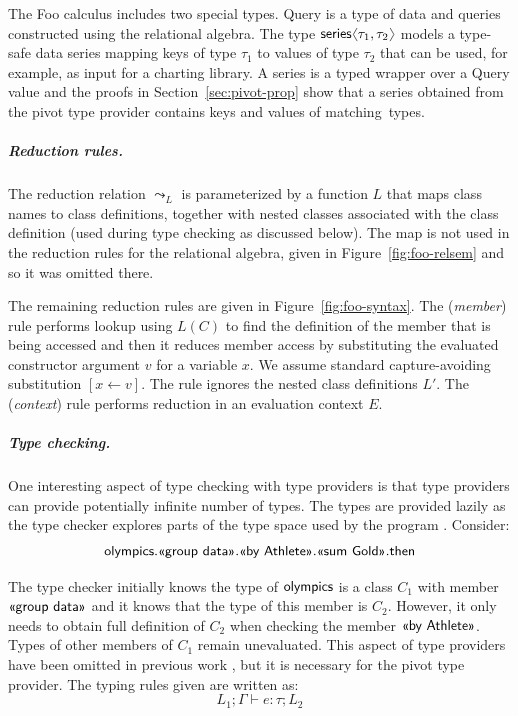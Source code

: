 \documentclass[a4paper,UKenglish]{lipics-v2016}
\theoremstyle{plain}
\theoremstyle{definition}
\newcommand{\langl}{\begin{picture}(4.5,7)
\put(1.1,2.5){\rotatebox{60}{\line(1,0){5.5}}}
\put(1.1,2.5){\rotatebox{300}{\line(1,0){5.5}}}
\end{picture}}
\newcommand{\rangl}{\begin{picture}(4.5,7)
\put(.9,2.5){\rotatebox{120}{\line(1,0){5.5}}}
\put(.9,2.5){\rotatebox{240}{\line(1,0){5.5}}}
\end{picture}}
\newcommand{\ident}[1]{\textnormal{\sffamily #1}}
\newcommand{\qident}[1]{\textnormal{\sffamily \guillemotleft #1\guillemotright}}
\begin{document}
The Foo calculus includes two special types. \ident{Query} is a type of data and queries 
constructed using the relational algebra. The type $\ident{series}\langl \tau_1, \tau_2 \rangl$ 
models a type-safe data series mapping keys of type $\tau_1$ to values of type $\tau_2$ that
can be used, for example, as input for a charting library. A series is a typed wrapper over a 
\ident{Query} value and the proofs in Section~\ref{sec:pivot-prop} show that a series obtained 
from the pivot type provider contains keys and values of matching~types.

\subparagraph{Reduction rules.} The reduction relation $\leadsto_L$ is parameterized by a function
$L$ that maps class names to class definitions, together with nested classes associated with the
class definition (used during type checking as discussed below). The map is not used in the 
reduction rules for the relational algebra, given in Figure~\ref{fig:foo-relsem} and so it was 
omitted there.

The remaining reduction rules are given in Figure~\ref{fig:foo-syntax}. The (\emph{member}) rule 
performs lookup using $L(C)$ to find the definition of the member that is being accessed and then
it reduces member access by substituting the evaluated constructor argument $v$ for a variable $x$.
We assume standard capture-avoiding substitution $[x\leftarrow v]$. The rule ignores the nested 
class definitions $L'$. The (\emph{context}) rule performs reduction in an evaluation context $E$.

\subparagraph{Type checking.} One interesting aspect of type checking with type providers is that
type providers can provide potentially infinite number of types. The types are provided 
lazily as the type checker explores parts of the type space used by the program \cite{inforich}. 
Consider:
%
\begin{equation*}
\ident{olympics}.\qident{group data}.\qident{by Athlete}.\qident{sum Gold}.\ident{then}
\end{equation*}

\noindent
The type checker initially knows the type of $\ident{olympics}$ is a class $C_1$ with member 
$\qident{group data}$ and it knows that the type of this member is $C_2$. However, it only needs to 
obtain full definition of $C_2$ when checking the member $\qident{by Athlete}$. Types of other 
members of $C_1$ remain unevaluated. This aspect of type
providers have been omitted in previous work \cite{fsdata,liteq}, but it is necessary for the pivot type provider.
The typing rules given are written as:
%
\begin{equation*}
L_1; \Gamma \vdash e : \tau; L_2
\end{equation*}
\end{document}

